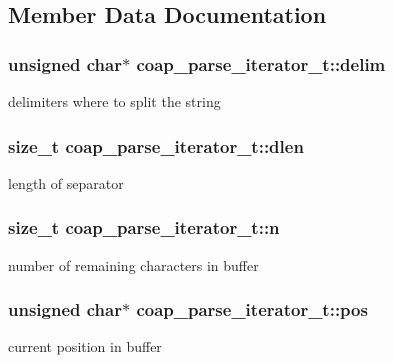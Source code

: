 \subsection{Member Data Documentation}
\hypertarget{structcoap__parse__iterator__t_a99403d81b015a9546076418818e2a9e8}{}
\subsubsection[{delim}]{\setlength{\rightskip}{0pt plus 5cm}unsigned char$\ast$ coap\+\_\+parse\+\_\+iterator\+\_\+t\+::delim}\label{structcoap__parse__iterator__t_a99403d81b015a9546076418818e2a9e8}
delimiters where to split the string \hypertarget{structcoap__parse__iterator__t_a77fe2df68b100c25377467c4e9800d3b}{}
\subsubsection[{dlen}]{\setlength{\rightskip}{0pt plus 5cm}size\+\_\+t coap\+\_\+parse\+\_\+iterator\+\_\+t\+::dlen}\label{structcoap__parse__iterator__t_a77fe2df68b100c25377467c4e9800d3b}
length of separator \hypertarget{structcoap__parse__iterator__t_add880e08de4e82ced1464839db82542f}{}
\subsubsection[{n}]{\setlength{\rightskip}{0pt plus 5cm}size\+\_\+t coap\+\_\+parse\+\_\+iterator\+\_\+t\+::n}\label{structcoap__parse__iterator__t_add880e08de4e82ced1464839db82542f}
number of remaining characters in buffer \hypertarget{structcoap__parse__iterator__t_adee3cf3ea7a964650516a056ee437109}{}
\subsubsection[{pos}]{\setlength{\rightskip}{0pt plus 5cm}unsigned char$\ast$ coap\+\_\+parse\+\_\+iterator\+\_\+t\+::pos}\label{structcoap__parse__iterator__t_adee3cf3ea7a964650516a056ee437109}
current position in buffer \hypertarget{structcoap__parse__iterator__t_a8349e7131718619149694cd5ac337537}{}
